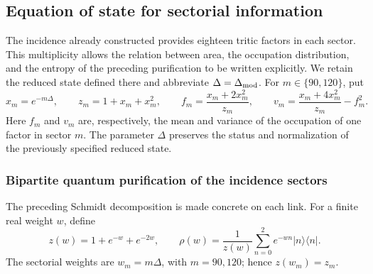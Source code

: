 \subsection{Equation of state for sectorial information}
\label{ii:sec:ii-ecuacion-informacion}

The incidence already constructed provides eighteen tritic factors in
each sector. This multiplicity allows the relation between area,
the occupation distribution, and the entropy of the preceding
purification to be written explicitly. We retain the reduced state defined there
and abbreviate $\Delta=\Delta_{\rm mod}$. For $m\in\{90,120\}$, put
\begin{equation}
 x_m=e^{-m\Delta},\qquad z_m=1+x_m+x_m^2,\qquad
 f_m=\frac{x_m+2x_m^2}{z_m},\qquad
 v_m=\frac{x_m+4x_m^2}{z_m}-f_m^2.
 \label{ii:eq:ii-sector-momentos}
\end{equation}
Here $f_m$ and $v_m$ are, respectively, the mean and variance of
the occupation of one factor in sector $m$. The parameter $\Delta$ preserves
the status and normalization of the previously specified reduced
state.

\subsubsection{Bipartite quantum purification of the incidence sectors}
\label{ii:sec:ii-area-purificacion-producto}

The preceding Schmidt decomposition is made concrete on each link.
For a finite real weight \(w\), define
\[
 z(w)=1+e^{-w}+e^{-2w},\qquad
 \rho(w)=\frac1{z(w)}\sum_{n=0}^2e^{-wn}|n\rangle\langle n|.
\]
The sectorial weights are \(w_m=m\Delta\), with \(m=90,120\);
hence \(z(w_m)=z_m\).

